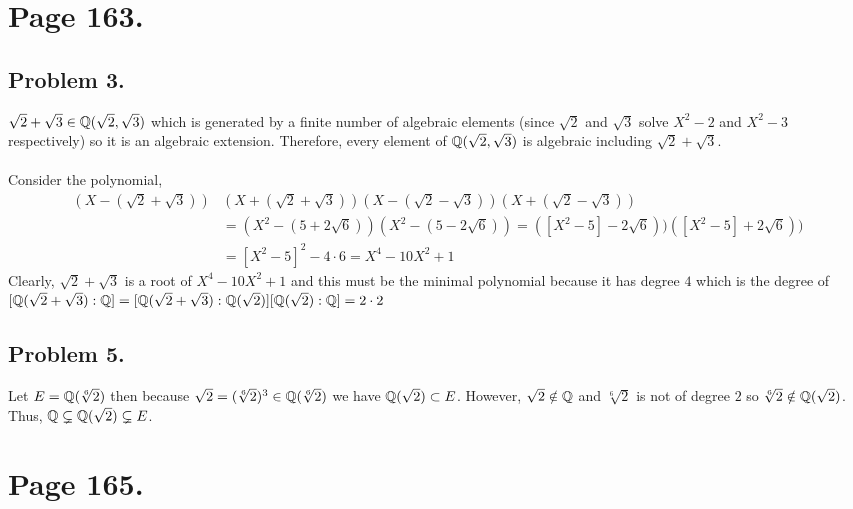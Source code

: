 \documentclass[12pt]{extarticle}
\begin{document}

\section*{Page 163.} 
\subsection*{Problem 3.}

$\sqrt{2} + \sqrt{3} \in \mathbb{Q}(\sqrt{2}, \sqrt{3})$ which is generated by a finite number of algebraic elements (since $\sqrt{2}$ and $\sqrt{3}$ solve $X^2 - 2$ and $X^2 - 3$ respectively) so it is an algebraic extension. Therefore, every element of $\mathbb{Q}(\sqrt{2}, \sqrt{3})$ is algebraic including $\sqrt{2} + \sqrt{3}$.  \\\\
Consider the polynomial,
\begin{align*}
(X - (\sqrt{2} + \sqrt{3})) & (X + (\sqrt{2} + \sqrt{3}))(X - (\sqrt{2} - \sqrt{3}))(X + (\sqrt{2} - \sqrt{3})) \\  & = (X^2 - (5 + 2 \sqrt{6}))(X^2 - (5 - 2 \sqrt{6})) = ([X^2 - 5] - 2 \sqrt{6}))([X^2 - 5] + 2 \sqrt{6})) \\ & = [X^2 - 5]^2 - 4 \cdot 6 = X^4 - 10 X^2 + 1
\end{align*}
Clearly, $\sqrt{2} + \sqrt{3}$ is a root of $X^4 - 10 X^2 + 1$ and this must be the minimal polynomial because it has degree $4$ which is the degree of $[\mathbb{Q}(\sqrt{2} + \sqrt{3}) : \mathbb{Q}] = [\mathbb{Q}(\sqrt{2} + \sqrt{3}) : \mathbb{Q}(\sqrt{2})][\mathbb{Q}(\sqrt{2}) : \mathbb{Q}] = 2 \cdot 2$

\subsection*{Problem 5.}
Let $E = \mathbb{Q}(\sqrt[6]{2})$ then because $\sqrt{2} = (\sqrt[6]{2})^3 \in \mathbb{Q}(\sqrt[6]{2})$ we have $\mathbb{Q}(\sqrt{2}) \subset E$. However, $\sqrt{2} \notin \mathbb{Q}$ and $\sqrt[6]{2}$ is not of degree $2$ so $\sqrt[6]{2} \notin \mathbb{Q}(\sqrt{2})$. Thus, $\mathbb{Q} \subsetneq \mathbb{Q}(\sqrt{2}) \subsetneq E$. 

\section*{Page 165.} 
\end{document}
